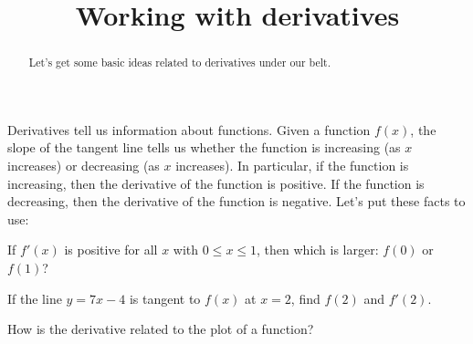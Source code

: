 \documentclass{ximera}
\title{Working with derivatives}
\begin{document}
\begin{abstract}
  Let's get some basic ideas related to derivatives under our belt.
\end{abstract}
\maketitle

Derivatives tell us information about functions. Given a function
$f(x)$, the slope of the tangent line tells us whether the function is
increasing (as $x$ increases) or decreasing (as $x$ increases).
In particular, if the function is increasing, then the derivative of the function is positive. If the function is decreasing, then the derivative of the function is negative. Let's put these facts to use:

\begin{question}
If $f'(x)$ is positive for all $x$ with $0\le x\le 1$, then which is
larger: $f(0)$ or $f(1)$?
    \begin{multipleChoice}
    \end{multipleChoice}  
\end{question}



\begin{question} 
If the line $y = 7x-4$ is tangent to $f(x)$ at $x=2$, find $f(2)$ and
$f'(2)$.
\begin{hint}
How is the derivative related to the plot of a function?
\end{hint}
\begin{multipleChoice}
\end{multipleChoice}
\end{question}
\end{document}
